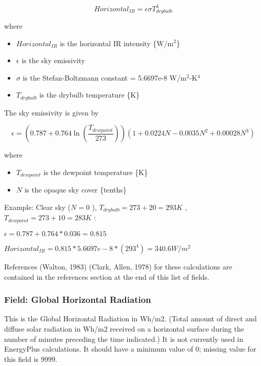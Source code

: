 \begin{equation}
Horizontal_{IR} = \epsilon\sigma T^4_{drybulb}
\end{equation}

where

\begin{itemize}
\tightlist
\item
  \(Horizontal_{IR}\) is the horizontal IR intensity \{W/m\(^{2}\)\}
\item
  \(\epsilon\) is the sky emissivity
\item
  \(\sigma\) is the Stefan-Boltzmann constant = 5.6697e-8 W/m\(^{2}\)-K\(^{4}\)
\item
  \(T_{drybulb}\) is the drybulb temperature \{K\}
\end{itemize}

The sky emissivity is given by

\begin{equation}
\epsilon = \left( 0.787 +0.764 \ln\left(\frac{T_{dewpoint}}{273}\right)\right)\left( 1 + 0.0224N - 0.0035N^2 + 0.00028N^3 \right)
\end{equation}

where

\begin{itemize}
\tightlist
\item
  \(T_{dewpoint}\) is the dewpoint temperature \{K\}
\item
  \(N\) is the opaque sky cover \{tenths\}
\end{itemize}

Example: Clear sky (\(N = 0\) ), \(T_{drybulb} = 273+20 = 293 K\) , \(T_{dewpoint} = 273+10 = 283 K\) :

\(\epsilon = 0.787 + 0.764*0.036 = 0.815\)

\(Horizontal_{IR} = 0.815*5.6697e-8*(293^4) = 340.6 W/m^2\)

References (Walton, 1983) (Clark, Allen, 1978) for these calculations are contained in the references section at the end of this list of fields.

\subsubsection{Field: Global Horizontal Radiation}\label{field-global-horizontal-radiation}

This is the Global Horizontal Radiation in Wh/m2. (Total amount of direct and diffuse solar radiation in Wh/m2 received on a horizontal surface during the number of minutes preceding the time indicated.) It is not currently used in EnergyPlus calculations. It should have a minimum value of 0; missing value for this field is 9999.

